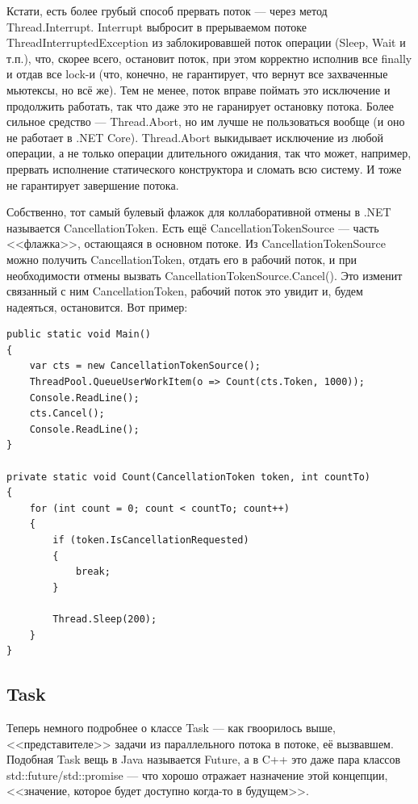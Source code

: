 \documentclass{../../text-style}
\begin{document}
Кстати, есть более грубый способ прервать поток --- через метод Thread.Interrupt. Interrupt выбросит в прерываемом потоке ThreadInterruptedException из заблокировавшей поток операции (Sleep, Wait и т.п.), что, скорее всего, остановит поток, при этом корректно исполнив все finally и отдав все lock-и (что, конечно, не гарантирует, что вернут все захваченные мьютексы, но всё же). Тем не менее, поток вправе поймать это исключение и продолжить работать, так что даже это не гаранирует остановку потока. Более сильное средство --- Thread.Abort, но им лучше не пользоваться вообще (и оно не работает в .NET Core). Thread.Abort выкидывает исключение из любой операции, а не только операции длительного ожидания, так что может, например, прервать исполнение статического конструктора и сломать всю систему. И тоже не гарантирует завершение потока.

Собственно, тот самый булевый флажок для коллаборативной отмены в .NET называется CancellationToken. Есть ещё CancellationTokenSource --- часть <<флажка>>, остающаяся в основном потоке. Из CancellationTokenSource можно получить CancellationToken, отдать его в рабочий поток, и при необходимости отмены вызвать CancellationTokenSource.Cancel(). Это изменит связанный с ним CancellationToken, рабочий поток это увидит и, будем надеяться, остановится. Вот пример:

\begin{verbatim}
public static void Main() 
{
    var cts = new CancellationTokenSource();
    ThreadPool.QueueUserWorkItem(o => Count(cts.Token, 1000));
    Console.ReadLine();
    cts.Cancel();
    Console.ReadLine();
}

private static void Count(CancellationToken token, int countTo) 
{
    for (int count = 0; count < countTo; count++) 
    {
        if (token.IsCancellationRequested) 
        {
            break;
        }

        Thread.Sleep(200); 
    }
}
\end{verbatim}

\subsection{Task}

Теперь немного подробнее о классе Task --- как гвоорилось выше, <<представителе>> задачи из параллельного потока в потоке, её вызвавшем. Подобная Task вещь в Java называется Future, а в C++ это даже пара классов std::future/std::promise --- что хорошо отражает назначение этой концепции, <<значение, которое будет доступно когда-то в будущем>>. 
\end{document}
